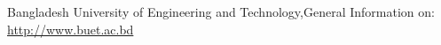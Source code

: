 \documentclass[a4paper,12pt]{book}
\begin{document}
\begin{thebibliography}{9}
Bangladesh University of Engineering and Technology,General Information on:
\url{http://www.buet.ac.bd} 
\end{thebibliography}
\end{document}
